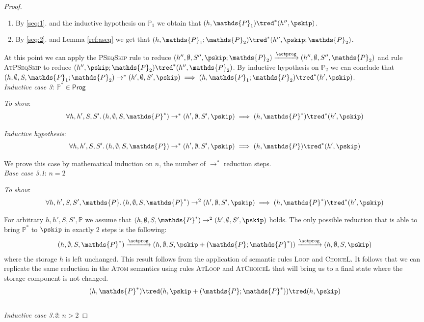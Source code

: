 \begin{thm}
{\begin{proof}
\begin{enumerate}
	\item \label{seq:2} By \ref{seq:1}. and the inductive hypothesis on $\mathds{P}_1$ we obtain that $(h, \mathds{P}_1) \tred^* (h'', \pskip)$.
	
	\item By \ref{seq:2}. and Lemma \ref{ref:aseq} we get that $(h, \mathds{P}_1 ; \mathds{P}_2) \tred^* (h'', \pskip ; \mathds{P}_2)$.
\end{enumerate}

At this point we can apply the \textsc{PSeqSkip} rule to reduce $(h'', \emptyset, S'', \pskip ; \mathds{P}_2) \xrightarrow{\actprog} (h'', \emptyset, S'', \mathds{P}_2)$ and rule \textsc{AtPSeqSkip} to reduce $(h'', \pskip ; \mathds{P}_2) \tred^* (h'', \mathds{P}_2)$. By inductive hypothesis on $\mathds{P}_2$ we can conclude that $(h, \emptyset, S, \mathds{P}_1 ; \mathds{P}_2) \rightarrow^* (h', \emptyset, S', \pskip) \implies (h, \mathds{P}_1 ; \mathds{P}_2) \tred^* (h', \pskip)$. \\
\indline
\textit{Inductive case 3}: $\mathds{P}^* \in \mathsf{Prog}$

\textit{To show}:
\[
	\forall h, h', S, S' \ldotp
	(h, \emptyset, S, \mathds{P}^*) \rightarrow^* (h', \emptyset, S', \pskip) \implies 
	(h, \mathds{P}^* ) \tred^* (h', \pskip)
\]

\textit{Inductive hypothesis}:
\[
	\forall h, h', S, S' \ldotp
	(h, \emptyset, S, \mathds{P}) \rightarrow^* (h', \emptyset, S', \pskip) \implies 
	(h, \mathds{P}) \tred^* (h', \pskip)
\]

We prove this case by mathematical induction on $n$, the number of $\rightarrow^*$ reduction steps. \\

\textit{Base case 3.1}: $n = 2$

\textit{To show}:
\[
	\forall h, h', S, S', \mathds{P} \ldotp
	(h, \emptyset, S, \mathds{P}^*) \rightarrow^{2} (h', \emptyset, S', \pskip) \implies 
	(h, \mathds{P}^*) \tred^* (h', \pskip)
\]

For arbitrary $h, h', S, S', \mathds{P}$ we assume that $(h, \emptyset, S, \mathds{P}^*) \rightarrow^{2} (h', \emptyset, S', \pskip)$ holds. The only possible reduction that is able to bring $\mathds{P}^*$ to $\pskip$ in exactly $2$ steps is the following:
\[
	(h, \emptyset, S, \mathds{P}^*) \xrightarrow{\actprog} (h, \emptyset, S, \pskip + (\mathds{P} ; \mathds{P}^*)) \xrightarrow{\actprog} (h, \emptyset, S, \pskip)
\]
where the storage $h$ is left unchanged. This result follows from the application of semantic rules \textsc{Loop} and \textsc{ChoiceL}. It follows that we can replicate the same reduction in the \textsc{Atom} semantics using rules \textsc{AtLoop} and \textsc{AtChoiceL} that will bring us to a final state where the storage component is not changed.
\[
	(h, \mathds{P}^*) \tred (h, \pskip + (\mathds{P} ; \mathds{P}^*)) \tred (h, \pskip)
\]
\\
\textit{Inductive case 3.2}: $n > 2$


\end{proof}}
\end{thm}
